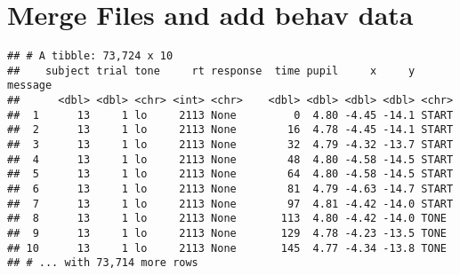 \documentclass[
]{article}
\newenvironment{Shaded}{\begin{snugshade}}{\end{snugshade}}
\newcommand{\AttributeTok}[1]{\textcolor[rgb]{0.77,0.63,0.00}{#1}}
\newcommand{\CommentTok}[1]{\textcolor[rgb]{0.56,0.35,0.01}{\textit{#1}}}
\newcommand{\FunctionTok}[1]{\textcolor[rgb]{0.00,0.00,0.00}{#1}}
\newcommand{\NormalTok}[1]{#1}
\newcommand{\OtherTok}[1]{\textcolor[rgb]{0.56,0.35,0.01}{#1}}
\newcommand{\SpecialCharTok}[1]{\textcolor[rgb]{0.00,0.00,0.00}{#1}}
\newcommand{\StringTok}[1]{\textcolor[rgb]{0.31,0.60,0.02}{#1}}
\begin{document}
\hypertarget{merge-files-and-add-behav-data}{%
\section{Merge Files and add behav
data}\label{merge-files-and-add-behav-data}}

\begin{Shaded}
\end{Shaded}

\begin{verbatim}
## # A tibble: 73,724 x 10
##    subject trial tone     rt response  time pupil     x     y message
##      <dbl> <dbl> <chr> <int> <chr>    <dbl> <dbl> <dbl> <dbl> <chr>  
##  1      13     1 lo     2113 None         0  4.80 -4.45 -14.1 START  
##  2      13     1 lo     2113 None        16  4.78 -4.45 -14.1 START  
##  3      13     1 lo     2113 None        32  4.79 -4.32 -13.7 START  
##  4      13     1 lo     2113 None        48  4.80 -4.58 -14.5 START  
##  5      13     1 lo     2113 None        64  4.80 -4.58 -14.5 START  
##  6      13     1 lo     2113 None        81  4.79 -4.63 -14.7 START  
##  7      13     1 lo     2113 None        97  4.81 -4.42 -14.0 START  
##  8      13     1 lo     2113 None       113  4.80 -4.42 -14.0 TONE   
##  9      13     1 lo     2113 None       129  4.78 -4.23 -13.5 TONE   
## 10      13     1 lo     2113 None       145  4.77 -4.34 -13.8 TONE   
## # ... with 73,714 more rows
\end{verbatim}
\end{document}
